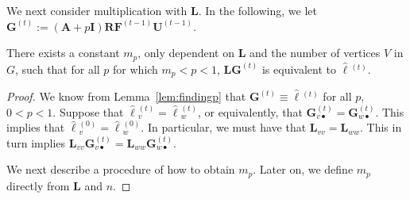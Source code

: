 We next consider multiplication with $\mathbf{L}$. In the following, we let $\mathbf{G}^{(t)}:=(\mathbf{A}+p\mathbf{I})\mathbf{R}\mathbf{F}^{(t-1)}\mathbf{U}^{(t-1)}$.

\begin{lemma}\label{lemma:findp}
There exists a constant $m_p$, only dependent on $\mathbf{L}$ and the number of vertices $V$ in $G$, such that for all $p$ for which $m_p<p<1$, $\mathbf{L}\mathbf{G}^{(t)}$ is equivalent to $\hat{\pmb{\ell}}{}^{(t)}$.
\end{lemma}
\begin{proof}
	We know from Lemma~\ref{lem:findingp} that
 $\mathbf{G}^{(t)}\equiv\hat{\pmb{\ell}}{}^{(t)}$ for all $p$, $0<p<1$.
	Suppose that $\hat{\pmb{\ell}}{}^{(t)}_v=\hat{\pmb{\ell}}{}^{(t)}_w$, or equivalently, that	$\mathbf{G}^{(t)}_{v\bullet}=\mathbf{G}^{(t)}_{w\bullet}$. This implies that
	  $\hat{\pmb{\ell}}{}^{(0)}_v=\hat{\pmb{\ell}}{}^{(0)}_w$. In particular, we must have that $\mathbf{L}_{vv}=\mathbf{L}_{ww}$. This in turn implies
$\mathbf{L}_{vv}\mathbf{G}^{(t)}_{v\bullet}=\mathbf{L}_{ww}\mathbf{G}^{(t)}_{w\bullet}$.

We next describe a procedure of how to obtain $m_p$. Later on, we define $m_p$ directly
from $\mathbf{L}$ and $n$.


\end{proof}
